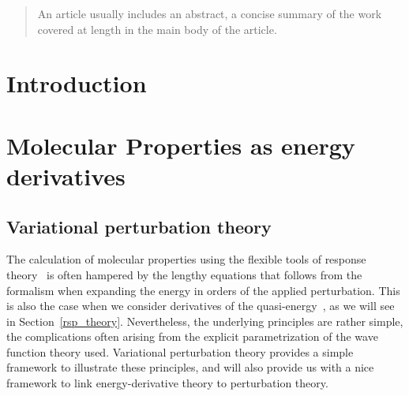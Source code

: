 \documentclass[%
 reprint,
 amsmath,amssymb,
 aps,
]{revtex4-1}
\begin{document}
\begin{abstract}
An article usually includes an abstract, a concise summary of the work
covered at length in the main body of the article.
\end{abstract}

\maketitle


\section{\label{sec:intro}Introduction}



\section{\label{sec:MolProp}Molecular Properties as energy derivatives}

\subsection{Variational perturbation theory}

The calculation of molecular properties using the flexible tools of response
theory~\cite{} is often hampered by the lengthy equations that follows from the
formalism when expanding the energy in orders of the applied perturbation. This
is also the case when we consider derivatives of the quasi-energy~\cite{}, as
we will see in Section~\ref{rsp_theory}. Nevertheless, the underlying
principles are rather simple, the complications often arising from the explicit
parametrization of the wave function theory used. Variational perturbation
theory provides a simple framework to illustrate these principles, and will
also provide us with a nice framework to link energy-derivative theory to
perturbation theory.
\end{document}

